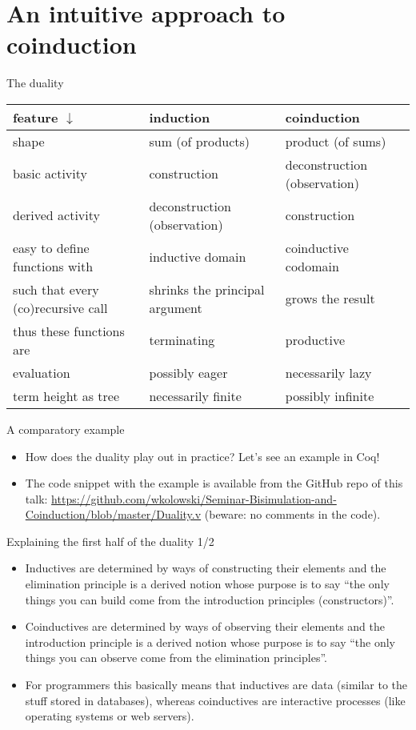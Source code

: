 \documentclass{beamer}
\begin{document}
\section{An intuitive approach to coinduction}

\begin{frame}{The duality}
\begin{tabular}{ | p{3cm} | p{3cm} | p{3cm} | }
	\hline
	feature $\downarrow$ & induction & coinduction \\\hline
	shape & sum (of products) & product (of sums) \\\hline
	basic activity & construction & deconstruction (observation) \\\hline
	derived activity & deconstruction (observation) & construction \\\hline
	easy to define functions with & inductive domain & coinductive codomain \\\hline
	such that every (co)recursive call & shrinks the principal argument & grows the result \\\hline
	thus these functions are & terminating & productive \\\hline
	evaluation & possibly eager & necessarily lazy \\\hline
	term height as tree & necessarily finite & possibly infinite \\\hline
\end{tabular}
\end{frame}

\begin{frame}{A comparatory example}
\begin{itemize}
	\item How does the duality play out in practice? Let's see an example in Coq!
	\item The code snippet with the example is available from the GitHub repo of this talk: \url{https://github.com/wkolowski/Seminar-Bisimulation-and-Coinduction/blob/master/Duality.v} (beware: no comments in the code).
\end{itemize}
\end{frame}

\begin{frame}{Explaining the first half of the duality 1/2}
\begin{itemize}
	\item Inductives are determined by ways of constructing their elements and the elimination principle is a derived notion whose purpose is to say ``the only things you can build come from the introduction principles (constructors)''.
	\item Coinductives are determined by ways of observing their elements and the introduction principle is a derived notion whose purpose is to say ``the only things you can observe come from the elimination principles''.
	\item For programmers this basically means that inductives are data (similar to the stuff stored in databases), whereas coinductives are interactive processes (like operating systems or web servers).
\end{itemize}
\end{frame}
\end{document}
